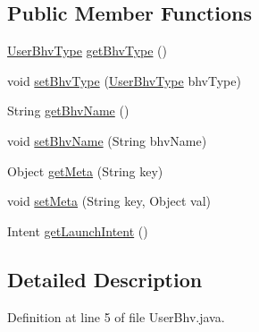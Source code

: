 \subsection*{\-Public \-Member \-Functions}
\begin{DoxyCompactItemize}
\item 
\hyperlink{enumlab_1_1davidahn_1_1appshuttle_1_1collect_1_1bhv_1_1_user_bhv_type}{\-User\-Bhv\-Type} \hyperlink{interfacelab_1_1davidahn_1_1appshuttle_1_1collect_1_1bhv_1_1_user_bhv_aa40041afff60cca4cb2b7351bc4614bb}{get\-Bhv\-Type} ()
\item 
void \hyperlink{interfacelab_1_1davidahn_1_1appshuttle_1_1collect_1_1bhv_1_1_user_bhv_afac65339264632acc29725e52f7bd091}{set\-Bhv\-Type} (\hyperlink{enumlab_1_1davidahn_1_1appshuttle_1_1collect_1_1bhv_1_1_user_bhv_type}{\-User\-Bhv\-Type} bhv\-Type)
\item 
\-String \hyperlink{interfacelab_1_1davidahn_1_1appshuttle_1_1collect_1_1bhv_1_1_user_bhv_a16c8cfa47dc39ba10e931c730295a3f3}{get\-Bhv\-Name} ()
\item 
void \hyperlink{interfacelab_1_1davidahn_1_1appshuttle_1_1collect_1_1bhv_1_1_user_bhv_a9bdde3725bfb706d47e56b07a075ae1f}{set\-Bhv\-Name} (\-String bhv\-Name)
\item 
\-Object \hyperlink{interfacelab_1_1davidahn_1_1appshuttle_1_1collect_1_1bhv_1_1_user_bhv_adc422b1e195391df0633f3f701678bf1}{get\-Meta} (\-String key)
\item 
void \hyperlink{interfacelab_1_1davidahn_1_1appshuttle_1_1collect_1_1bhv_1_1_user_bhv_a44d48ccb2bdafd12e1868af3427859fb}{set\-Meta} (\-String key, \-Object val)
\item 
\-Intent \hyperlink{interfacelab_1_1davidahn_1_1appshuttle_1_1collect_1_1bhv_1_1_user_bhv_a553da928abe8f7305ad3663fe6212365}{get\-Launch\-Intent} ()
\end{DoxyCompactItemize}


\subsection{\-Detailed \-Description}


\-Definition at line 5 of file \-User\-Bhv.\-java.



